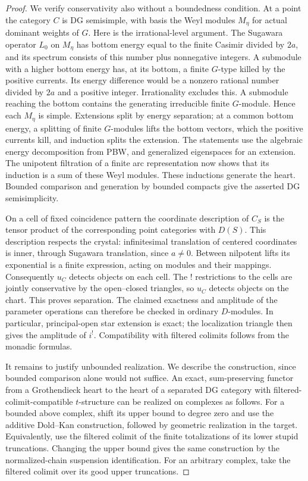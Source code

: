 \documentclass[11pt]{article}
\numberwithin{equation}{section}
\theoremstyle{definition}
\theoremstyle{remark}
\begin{document}
\begin{proof}
We verify conservativity also without a boundedness condition.
At a point the category $C$ is DG semisimple, with basis the Weyl
modules $M_\eta$ for actual dominant weights of $G$.  Here is the
irrational-level argument.  The Sugawara operator $L_0$ on $M_\eta$
has bottom energy equal to the finite Casimir divided by $2a$, and
its spectrum consists of this number plus nonnegative integers.
A submodule with a higher bottom energy has, at its bottom, a finite
$G$-type killed by the positive currents.  Its energy difference
would be a nonzero rational number divided by $2a$ and a positive
integer.  Irrationality excludes this.  A submodule reaching the
bottom contains the generating irreducible finite $G$-module.
Hence each $M_\eta$ is simple.  Extensions split by energy separation;
at a common bottom energy, a splitting of finite $G$-modules lifts
the bottom vectors, which the positive currents kill, and induction
splits the extension.  The statements use the algebraic energy
decomposition from PBW, and generalized eigenspaces for an extension.
The unipotent filtration of a finite arc representation now shows
that its induction is a sum of these Weyl modules.  These inductions
generate the heart.  Bounded comparison and generation by bounded
compacts give the asserted DG semisimplicity.

On a cell of fixed coincidence pattern the coordinate description
of $C_S$ is the tensor product of the corresponding point categories
with $D(S)$.  This description respects the crystal: infinitesimal
translation of centered coordinates is inner, through Sugawara
translation, since $a\ne0$.  Between nilpotent lifts its exponential
is a finite expression, acting on modules and their mappings.
Consequently $u_C$ detects objects on each cell.  The ! restrictions
to the cells are jointly conservative by the open--closed triangles,
so $u_C$ detects objects on the chart.  This proves separation.
The claimed exactness and amplitude of the parameter operations
can therefore be checked in ordinary $D$-modules.  In particular,
principal-open star extension is exact; the localization triangle
then gives the amplitude of $i^!$.  Compatibility with filtered
colimits follows from the monadic formulas.

It remains to justify unbounded realization.  We describe the
construction, since bounded comparison alone would not suffice.
An exact, sum-preserving functor from a Grothendieck heart to the
heart of a separated DG category with filtered-colimit-compatible
$t$-structure can be realized on complexes as follows.  For a
bounded above complex, shift its upper bound to degree zero and
use the additive Dold--Kan construction, followed by geometric
realization in the target.  Equivalently, use the filtered colimit
of the finite totalizations of its lower stupid truncations.
Changing the upper bound gives the same construction by the
normalized-chain suspension identification.  For an arbitrary
complex, take the filtered colimit over its good upper truncations.


\end{proof}
\end{document}
